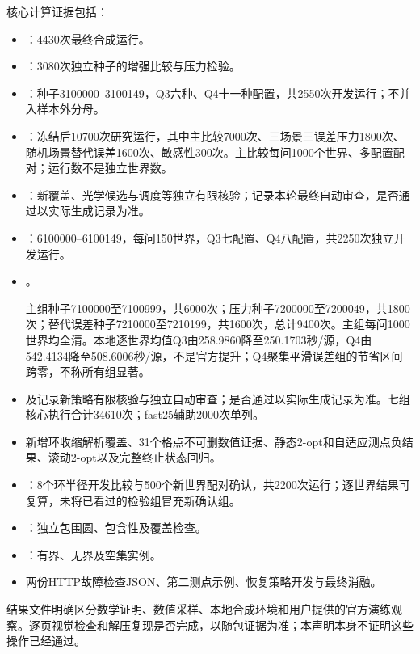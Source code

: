 \documentclass[UTF8,fontset=fandol,a4paper,zihao=-4]{ctexart}
\begin{document}
核心计算证据包括：
\begin{itemize}
\item{}：4430次最终合成运行。
\item{}：3080次独立种子的增强比较与压力检验。
\item{}：种子3100000--3100149，Q3六种、Q4十一种配置，共2550次开发运行；不并入样本外分母。
\item{}：冻结后10700次研究运行，其中主比较7000次、三场景三误差压力1800次、随机场景替代误差1600次、敏感性300次。主比较每问1000个世界、多配置配对；运行数不是独立世界数。
\item{}：新覆盖、光学候选与调度等独立有限核验；记录本轮最终自动审查，是否通过以实际生成记录为准。
\item{}：6100000--6100149，每问150世界，Q3七配置、Q4八配置，共2250次独立开发运行。
\item{}。\par
主组种子7100000至7100999，共6000次；压力种子7200000至7200049，共1800次；替代误差种子7210000至7210199，共1600次，总计9400次。主组每问1000世界均全清。本地逐世界均值Q3由258.9860降至250.1703秒/源，Q4由542.4134降至508.6006秒/源，不是官方提升；Q4聚集平滑误差组的节省区间跨零，不称所有组显著。
\item{}及记录新策略有限核验与独立自动审查；是否通过以实际生成记录为准。七组核心执行合计34610次；fast25辅助2000次单列。
\item 新增环收缩解析覆盖、31个格点不可删数值证据、静态2-opt和自适应测点负结果、滚动2-opt以及完整终止状态回归。
\item{}：8个环半径开发比较与500个新世界配对确认，共2200次运行；逐世界结果可复算，未将已看过的检验组冒充新确认组。
\item{}：独立包围圆、包含性及覆盖检查。
\item{}：有界、无界及空集实例。
\item 两份HTTP故障检查JSON、第二测点示例、恢复策略开发与最终消融。
\end{itemize}
结果文件明确区分数学证明、数值采样、本地合成环境和用户提供的官方演练观察。逐页视觉检查和解压复现是否完成，以随包证据为准；本声明本身不证明这些操作已经通过。
\end{document}
